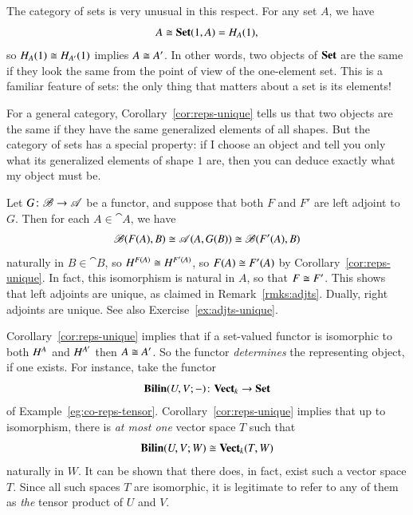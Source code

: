 \begin{example}
The category of sets is very unusual in this respect.  For any set $A$, we have
\[
A \cong \mathbf{Set}(1, A) = H_A(1),
\]
so $H_A(1) \cong H_{A'}(1)$ implies $A \cong A'$.  In other words, two
objects of $\mathbf{Set}$ are the same if they look the same from the point of view
of the one-element set.  This is a familiar feature of sets: the only thing
that matters about a set is its elements!

For a general category, Corollary~\ref{cor:reps-unique} tells us that two
objects are the same if they have the same generalized%
%
%
elements of all shapes.  But the category of sets has a special property:
if I choose an object and tell you only what its generalized elements of
shape $1$ are, then you can deduce exactly what my object must be.
\end{example}

\begin{example}
\label{eg:yon-adjts-unique}
Let $G\from \cat{B} \to \cat{A}$ be a functor, and suppose that both $F$
and $F'$ are left adjoint to $G$.  Then for each $A \in \cat{A}$, we have
\[
\mathscr{B}(F(A), B)
\cong
\mathscr{A}(A, G(B))
\cong
\mathscr{B}(F'(A), B)
\]
naturally in $B \in \cat{B}$, so $H^{F(A)} \cong H^{F'(A)}$, so $F(A) \cong
F'(A)$ by Corollary~\ref{cor:reps-unique}.  In fact, this isomorphism is
natural in $A$, so that $F \cong F'$.  This shows that left adjoints are
unique, as claimed in Remark~\ref{rmks:adjts}.
Dually, right adjoints are unique.  See also Exercise~\ref{ex:adjts-unique}.
\end{example}

\begin{example}
Corollary~\ref{cor:reps-unique} implies that if a set-valued functor is
isomorphic to both $H^A$ and $H^{A'}$ then $A \cong A'$.  So the functor
\emph{determines} the representing object, if one exists.  For instance, take
the functor
\[
\Bilin(U, V; \dashbk)\from \Vect_k \to \Set
%
\index{map!bilinear}
%
\]
of Example~\ref{eg:co-reps-tensor}.  Corollary~\ref{cor:reps-unique}
implies that up to isomorphism, there is \emph{at most one} vector space
$T$ such that
\[
\mathbf{Bilin}(U, V; W) \cong \mathbf{Vect}_k(T, W)
\]
naturally in $W$.  It can be shown that there does, in fact, exist such a
vector space $T$.  Since all such spaces $T$ are isomorphic, it is
legitimate to refer to any of them as \emph{the}%
%
%
tensor%
%
%
product of $U$ and $V$.
\end{example}
%
%

